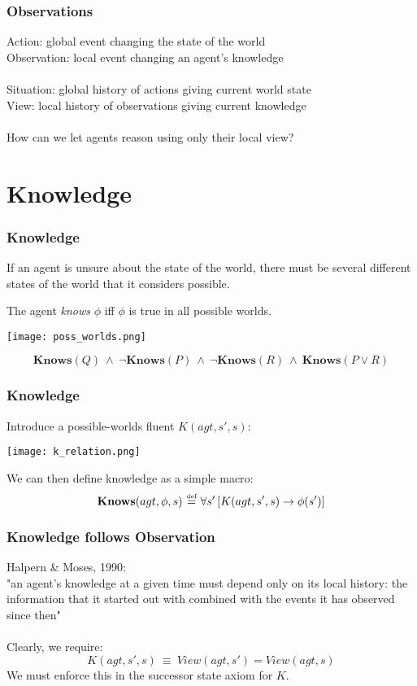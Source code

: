 \documentclass{beamer}
\newcommand{\isdef}{\hbox{$\stackrel{\mbox{\tiny def}}{=}$}}
\begin{document}
\begin{frame}
\frametitle{Observations}
Action:  global event changing the state of the world\\
Observation:  local event changing an agent's knowledge
\ \\
\ \\
Situation:  global history of actions giving current world state\\
View:  local history of observations giving current knowledge
\ \\
\ \\
\pause
How can we let agents reason using only their local view?
\end{frame}

\section{Knowledge}

\begin{frame}
\frametitle{Knowledge}
If an agent is unsure about the state of the world, there must be several
different states of the world that it considers possible.

The agent \emph{knows} $\phi$ iff $\phi$ is true in all possible worlds.

\begin{center}
  \texttt{[image: poss\_worlds.png]}
\end{center}

\begin{equation*}
\mathbf{Knows}(Q)\ \wedge\ \neg\mathbf{Knows}(P)\ \wedge\ \neg\mathbf{Knows}(R)\ \wedge\ \mathbf{Knows}(P \vee R)
\end{equation*}

\end{frame}

\begin{frame}
\frametitle{Knowledge}
Introduce a possible-worlds fluent $K(agt,s',s)$:

\begin{center}
  \texttt{[image: k\_relation.png]}
\end{center}

We can then define knowledge as a simple macro:
\[ \mathbf{Knows}(agt,\phi,s)\ \isdef\ \forall s'\left[K(agt,s',s)\rightarrow \phi(s')\right] \]
\end{frame}

\begin{frame}
\frametitle{Knowledge follows Observation}
Halpern \& Moses, 1990:\\
"an agent's knowledge at a given time must depend only on its local history:
the information that it started out with combined with the events it has
observed since then"
\pause
\ \\
\ \\
Clearly, we require:
\begin{equation*}
K(agt,s',s)\ \equiv\ View(agt,s') = View(agt,s)
\end{equation*}
We must enforce this in the successor state axiom for $K$.
\end{frame}
\end{document}
